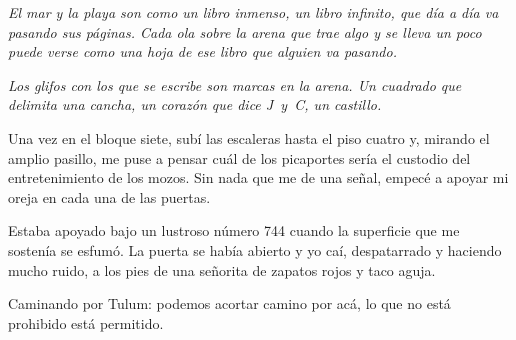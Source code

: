\documentclass[12pt,twoside,openright,a5paper]{book}
\begin{document}
\vspace{0.5cm}

\hrulefill\hspace{0.2cm} \decofourleft\decofourright \hspace{0.2cm} \hrulefill
\vspace{0.5cm}

\emph{El mar y la playa son como un libro inmenso, un libro infinito, que día
a día va pasando sus páginas. Cada ola sobre la arena que trae algo y se
lleva un poco puede verse como una hoja de ese libro que alguien va pasando.}

\emph{Los glifos con los que se escribe son marcas en la arena. Un cuadrado que
delimita una cancha, un corazón que dice \mbox{J y C}, un castillo.}

\vspace{0.5cm}

\hrulefill\hspace{0.2cm} \decofourleft\decofourright \hspace{0.2cm} \hrulefill
\vspace{0.5cm}

Una vez en el bloque siete, subí las escaleras hasta el piso cuatro y,
mirando el amplio pasillo, me puse a pensar cuál de los picaportes sería el
custodio del entretenimiento de los mozos. Sin nada que me de una señal,
empecé a apoyar mi oreja en cada una de las puertas.

Estaba apoyado bajo un lustroso número 744 cuando la superficie que me
sostenía se esfumó. La puerta se había abierto y yo caí, despatarrado
y haciendo mucho ruido, a los pies de una señorita de zapatos rojos y
taco aguja.

\vspace{0.5cm}

\hrulefill\hspace{0.2cm} \decofourleft\decofourright \hspace{0.2cm} \hrulefill
\vspace{0.5cm}

Caminando por Tulum: podemos acortar camino por acá, lo que no está
prohibido está permitido.

\vspace{0.5cm}

\hrulefill\hspace{0.2cm} \decofourleft\decofourright \hspace{0.2cm} \hrulefill
\vspace{0.5cm}
\end{document}
